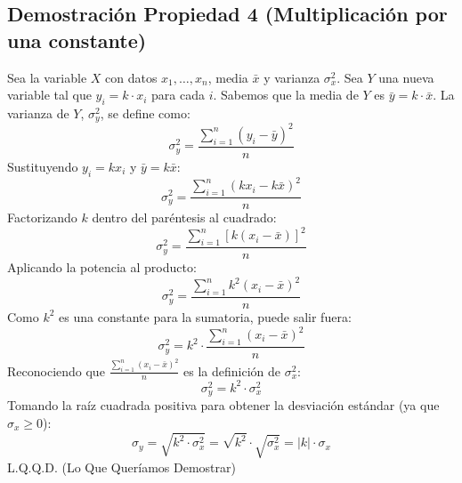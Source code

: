 \documentclass[12pt, letterpaper]{article}
\begin{document}
\subsection{Demostración Propiedad 4 (Multiplicación por una constante)}
Sea la variable $X$ con datos $x_1, \dots, x_n$, media $\bar{x}$ y varianza $\sigma_x^2$.
Sea $Y$ una nueva variable tal que $y_i = k \cdot x_i$ para cada $i$.
Sabemos que la media de $Y$ es $\bar{y} = k \cdot \bar{x}$.
La varianza de $Y$, $\sigma_y^2$, se define como:
\[\sigma_y^2=\frac{\sum_{i=1}^{n} (y_i - \bar{y})^2}{n} \]
Sustituyendo $y_i = kx_i$ y $\bar{y} = k\bar{x}$:
\[\sigma_y^2=\frac{\sum_{i=1}^{n} (kx_i - k\bar{x})^2}{n}\]
Factorizando $k$ dentro del paréntesis al cuadrado:
\[\sigma_y^2=\frac{\sum_{i=1}^{n} [k(x_i - \bar{x})]^2}{n}\]
Aplicando la potencia al producto:
\[\sigma_y^2=\frac{\sum_{i=1}^{n} k^2(x_i - \bar{x})^2}{n}\]
Como $k^2$ es una constante para la sumatoria, puede salir fuera:
\[\sigma_y^2=k^2 \cdot \frac{\sum_{i=1}^{n} (x_i - \bar{x})^2}{n}\]
Reconociendo que $\frac{\sum_{i=1}^{n} (x_i - \bar{x})^2}{n}$ es la definición de $\sigma_x^2$:
\[\sigma_y^2=k^2 \cdot \sigma_x^2\]
Tomando la raíz cuadrada positiva para obtener la desviación estándar (ya que $\sigma_x \ge 0$):
\[\sigma_y = \sqrt{k^2 \cdot \sigma_x^2} = \sqrt{k^2} \cdot \sqrt{\sigma_x^2} = |k| \cdot \sigma_x\]
L.Q.Q.D. (Lo Que Queríamos Demostrar)
\end{document}
